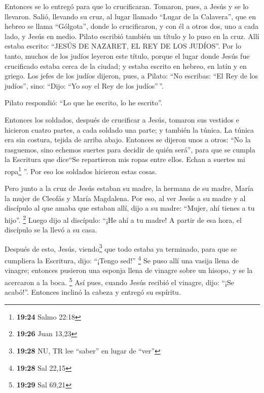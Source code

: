  Entonces se lo entregó para que lo crucificaran.
Tomaron, pues, a Jesús y se lo llevaron.  Salió, llevando
su cruz, al lugar llamado ``Lugar de la Calavera'', que en hebreo se
llama ``Gólgota'',  donde lo crucificaron, y con él a
otros dos, uno a cada lado, y Jesús en medio.  Pilato
escribió también un título y lo puso en la cruz. Allí estaba escrito:
``JESÚS DE NAZARET, EL REY DE LOS JUDÍOS''.  Por lo
tanto, muchos de los judíos leyeron este título, porque el lugar donde
Jesús fue crucificado estaba cerca de la ciudad; y estaba escrito en
hebreo, en latín y en griego.  Los jefes de los judíos
dijeron, pues, a Pilato: ``No escribas: ``El Rey de los judíos'', sino:
``Dijo: ``Yo soy el Rey de los judíos''\,''.

 Pilato respondió: ``Lo que he escrito, lo he escrito''.

 Entonces los soldados, después de crucificar a Jesús,
tomaron sus vestidos e hicieron cuatro partes, a cada soldado una parte;
y también la túnica. La túnica era sin costura, tejida de arriba abajo.
 Entonces se dijeron unos a otros: ``No la rasguemos,
sino echemos suertes para decidir de quién será'', para que se cumpla la
Escritura que dice``Se repartieron mis ropas entre ellos. Echan a
suertes mi ropa\footnote{\textbf{19:24} Salmo 22:18} ''. Por eso los
soldados hicieron estas cosas.

 Pero junto a la cruz de Jesús estaban su madre, la
hermana de su madre, María la mujer de Cleofás y María Magdalena.
 Por eso, al ver Jesús a su madre y al discípulo al que
amaba que estaban allí, dijo a su madre: ``Mujer, ahí tienes a tu
hijo''. \footnote{\textbf{19:26} Juan 13,23}  Luego dijo
al discípulo: ``¡He ahí a tu madre! A partir de esa hora, el discípulo
se la llevó a su casa.

 Después de esto, Jesús, viendo\footnote{\textbf{19:28}
  NU, TR lee ``saber'' en lugar de ``ver''} que todo estaba ya
terminado, para que se cumpliera la Escritura, dijo: ``¡Tengo sed!''
\footnote{\textbf{19:28} Sal 22,15}  Se puso allí una
vasija llena de vinagre; entonces pusieron una esponja llena de vinagre
sobre un hisopo, y se la acercaron a la boca. \footnote{\textbf{19:29}
  Sal 69,21}  Así pues, cuando Jesús recibió el vinagre,
dijo: ``¡Se acabó!''. Entonces inclinó la cabeza y entregó su espíritu.

